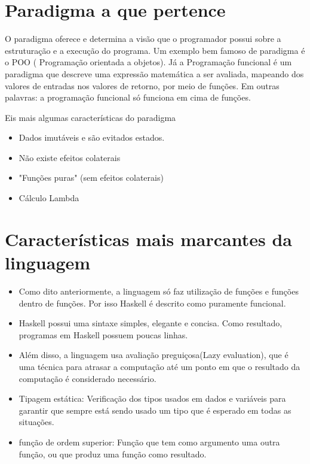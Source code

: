 \documentclass[12pt,openright,a4paper,brazil]{abntex2}
\begin{document}
    

    \chapter{Paradigma a que pertence}

    O paradigma oferece e determina a visão que o programador possui sobre a estruturação
    e a execução do programa. Um exemplo bem famoso de paradigma é o POO ( Programação orientada a objetos).
    Já a Programação funcional é um paradigma que descreve uma expressão matemática a ser avaliada,
    mapeando dos valores de entradas nos valores de retorno, por meio de funções. Em outras palavras: 
    a programação funcional só funciona em cima de funções.

    Eis mais algumas características do paradigma
    \begin{itemize}
      \item Dados imutáveis e são evitados estados. 
      \item Não existe efeitos colaterais 
      \item "Funções puras" (sem efeitos colaterais)
      \item Cálculo Lambda
    \end{itemize}

    \chapter{Características mais marcantes da linguagem}

    \begin{itemize}
      \item Como dito anteriormente, a linguagem só faz utilização de funções e funções dentro de funções. Por isso
      Haskell é descrito como puramente funcional.
      \item Haskell possui uma sintaxe simples, elegante e concisa. Como resultado, programas em Haskell possuem 
      poucas linhas. 
      \item Além disso, a linguagem usa avaliação preguiçosa(Lazy evaluation), que é uma técnica para atrasar a computação 
      até um ponto em que o resultado da computação é considerado necessário.
      \item Tipagem estática: Verificação dos tipos usados em dados e variáveis para 
      garantir que sempre está sendo usado um tipo que é esperado em todas as situações. 
      \item função de ordem superior: Função que tem como argumento uma outra função, ou que produz 
      uma função como resultado.
    \end{itemize}
\end{document}
